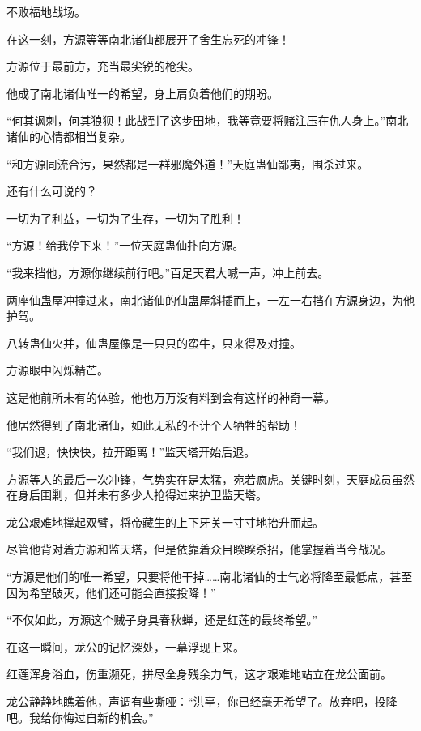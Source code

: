 
\begin{this_body}

不败福地战场。

在这一刻，方源等等南北诸仙都展开了舍生忘死的冲锋！

方源位于最前方，充当最尖锐的枪尖。

他成了南北诸仙唯一的希望，身上肩负着他们的期盼。

“何其讽刺，何其狼狈！此战到了这步田地，我等竟要将赌注压在仇人身上。”南北诸仙的心情都相当复杂。

“和方源同流合污，果然都是一群邪魔外道！”天庭蛊仙鄙夷，围杀过来。

还有什么可说的？

一切为了利益，一切为了生存，一切为了胜利！

“方源！给我停下来！”一位天庭蛊仙扑向方源。

“我来挡他，方源你继续前行吧。”百足天君大喊一声，冲上前去。

两座仙蛊屋冲撞过来，南北诸仙的仙蛊屋斜插而上，一左一右挡在方源身边，为他护驾。

八转蛊仙火并，仙蛊屋像是一只只的蛮牛，只来得及对撞。

方源眼中闪烁精芒。

这是他前所未有的体验，他也万万没有料到会有这样的神奇一幕。

他居然得到了南北诸仙，如此无私的不计个人牺牲的帮助！

“我们退，快快快，拉开距离！”监天塔开始后退。

方源等人的最后一次冲锋，气势实在是太猛，宛若疯虎。关键时刻，天庭成员虽然在身后围剿，但并未有多少人抢得过来护卫监天塔。

龙公艰难地撑起双臂，将帝藏生的上下牙关一寸寸地抬升而起。

尽管他背对着方源和监天塔，但是依靠着众目睽睽杀招，他掌握着当今战况。

“方源是他们的唯一希望，只要将他干掉……南北诸仙的士气必将降至最低点，甚至因为希望破灭，他们还可能会直接投降！”

“不仅如此，方源这个贼子身具春秋蝉，还是红莲的最终希望。”

在这一瞬间，龙公的记忆深处，一幕浮现上来。

红莲浑身浴血，伤重濒死，拼尽全身残余力气，这才艰难地站立在龙公面前。

龙公静静地瞧着他，声调有些嘶哑：“洪亭，你已经毫无希望了。放弃吧，投降吧。我给你悔过自新的机会。”


\end{this_body}
